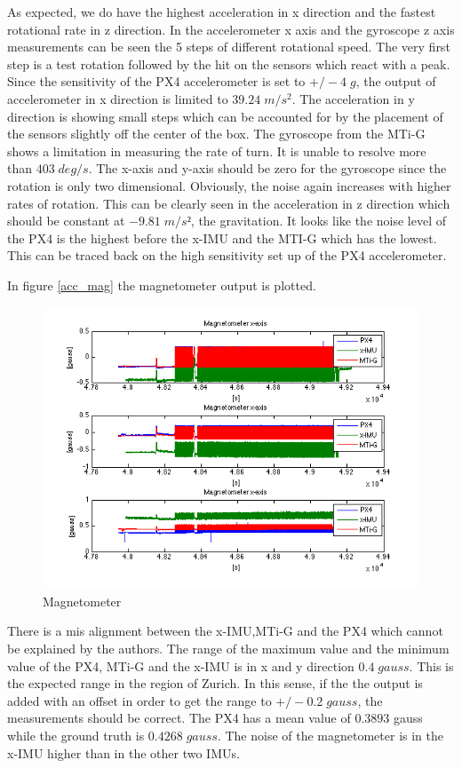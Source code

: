 As expected, we do have the highest acceleration in x direction and the fastest rotational rate in z direction. In the accelerometer x axis and the gyroscope z axis measurements can be seen the 5 steps of different rotational speed. The very first step is a test rotation followed by the hit on the sensors which react with a peak. Since the sensitivity of the PX4 accelerometer is set to $+/- 4 \;g$, the output of accelerometer in x direction is limited to $39.24 \;m/s^2$. The acceleration in y direction is showing small steps which can be accounted for by the placement of the sensors slightly off the center of the box. The gyroscope from the MTi-G shows a limitation in measuring the rate of turn. It is unable to resolve more than $ 403 \;deg/s$. The x-axis and y-axis should be zero for the gyroscope since the rotation is only two dimensional. Obviously, the noise again increases with higher rates of rotation. This can be clearly seen in the acceleration in z direction which should be constant at $-9.81 \;m/s²$, the gravitation. It looks like the noise level of the PX4 is the highest before the x-IMU and the MTI-G which has the lowest. This can be traced back on the high sensitivity set up of the PX4 accelerometer.


In figure \ref{acc_mag} the magnetometer output is plotted.
\begin{figure}[hb]
\includegraphics[width=1\textwidth]{pictures/ct_mag.png}
\caption{Magnetometer}
\label{ct_mag}
\end{figure}
There is a mis alignment between the x-IMU,MTi-G and the PX4 which cannot be explained by the authors. The range of the maximum value and the minimum value of the PX4, MTi-G and the x-IMU is in x and y direction $0.4 \;gauss$. This is the expected range in the region of Zurich. In this sense, if the the output is added with an offset in order to get the range to $+/- 0.2\; gauss$, the measurements should be correct. The PX4 has a mean value of $0.3893$ gauss while the ground truth is $0.4268 \;gauss$.  The noise of the magnetometer is in the x-IMU higher than in the other two IMUs.

